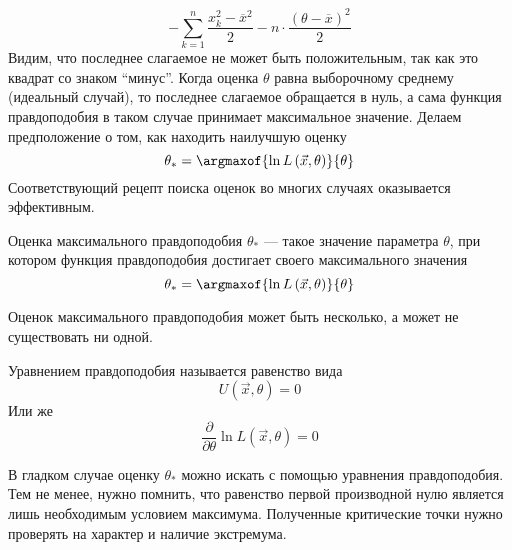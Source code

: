 \begin{example}
\begin{equation*}
      - \sum_{k=1}^n \frac{x_k^2 - \overline{x}^2}{2}
      - n \cdot \frac{\left( \theta - \overline{x} \right)^2}{2}
  \end{equation*}
  Видим, что последнее слагаемое не может быть положительным,
  так как это квадрат со знаком ``минус''.
  Когда оценка $\theta$ равна выборочному среднему (идеальный случай),
  то последнее слагаемое обращается в нуль, а сама функция правдоподобия
  в таком случае принимает максимальное значение.
  Делаем предположение о том, как находить наилучшую оценку
  \begin{equation*}
    \theta_* = \argmaxof{\ln{L\left( \vec{x}, \theta \right)}}{\theta}
  \end{equation*}
  Соответствующий рецепт поиска оценок во многих случаях оказывается
  эффективным.
\end{example}

\begin{definition}
  \label{def:maximumLikelihoodEstimation}
  Оценка максимального правдоподобия
  $\theta_*$ --- такое значение параметра $\theta$,
  при котором функция правдоподобия достигает своего максимального значения
  $$\theta_*= \argmaxof{\ln{L\left( \vec{x},\theta \right)}}{\theta}$$
\end{definition}

\begin{remark}
  Оценок максимального правдоподобия может быть несколько,
  а может не существовать ни одной.
\end{remark}

\begin{definition}
  Уравнением правдоподобия называется равенство вида
  \begin{equation*}
    U\left( \vec{x}, \theta \right) = 0
  \end{equation*}
  Или же
  \begin{equation*}
    \frac{\partial}{\partial\theta}\ln{L\left( \vec{x}, \theta \right)} = 0
  \end{equation*}
\end{definition}

\begin{remark}
  В гладком случае оценку $\theta_*$ можно искать с помощью уравнения
  правдоподобия.
  Тем не менее, нужно помнить, что равенство первой производной нулю является
  лишь необходимым условием максимума.
  Полученные критические точки нужно проверять на характер и наличие
  экстремума.
\end{remark}

